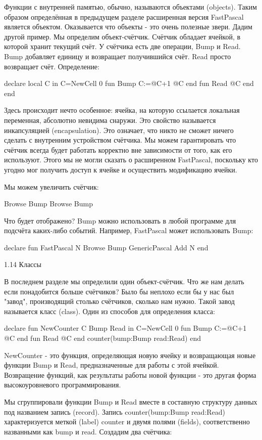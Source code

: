 Функции с внутренней памятью, обычно, называются объектами (objects). Таким образом определённая в предыдущем разделе расширенная версия FastPascal является объектом. Оказывается что объекты - это очень полезные звери. Дадим другой пример. Мы определим объект-счётчик. Счётчик обладает ячейкой, в которой хранит текущий счёт. У счётчика есть две операции, Bump и Read. Bump добавляет единицу и возвращает получившийся счёт. Read просто возвращает счёт. Определение:

declare
local C in
C={NewCell 0}
fun {Bump}
C:=@C+1
@C
end
fun {Read}
@C
end
end

Здесь происходит нечто особенное: ячейка, на которую ссылается локальная переменная, абсолютно невидима снаружи. Это свойство называется инкапсуляцией (encapsulation). Это означает, что никто не сможет ничего сделать с внутренним устройством счётчика. Мы можем гарантировать что счётчик всегда будет работать корректно вне зависимости от того, как его используют. Этого мы не могли сказать о расширенном FastPascal, поскольку кто угодно мог получить доступ к ячейке и осуществить модификацию ячейки.

Мы можем увеличить счётчик:

{Browse {Bump}}
{Browse {Bump}}

Что будет отображено? Bump можно использовать в любой программе для подсчёта каких-либо событий. Например, FastPascal может использовать Bump:

declare
fun {FastPascal N}
{Browse {Bump}}
{GenericPascal Add N}
end

1.14 Классы

В последнем разделе мы определили один объект-счётчик. Что же нам делать если понадобится больше счётчиков? Было бы неплохо если бы у нас был "завод", производящий столько счётчиков, сколько нам нужно. Такой завод называется класс (class). Один из способов для определения класса:

declare
fun {NewCounter}
C Bump Read in
C={NewCell 0}
fun {Bump}
C:=@C+1
@C
end
fun {Read}
@C
end
counter(bump:Bump read:Read)
end

NewCounter - это функция, определяющая новую ячейку и возвращающая новые функции Bump и Read, предназначенные для работы с этой ячейкой. Возвращение функций, как результаты работы новой функции - это другая форма высокоуровневого программирования.

Мы сгруппировали функции Bump и Read вместе в составную структуру данных под названием запись (record). Запись counter(bump:Bump read:Read) характеризуется меткой (label) counter и двумя полями (fields), соответственно названными как bump и read. Создадим два счётчика:

